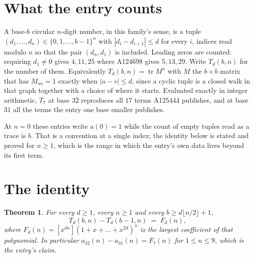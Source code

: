 \documentclass[11pt,a4paper]{article}
\theoremstyle{plain}
\newtheorem{theorem}{Theorem}
\theoremstyle{definition}
\begin{document}
\section{What the entry counts}

A base-$b$ circular $n$-digit number, in this family's sense, is a tuple
$(d_1,\dots,d_n)\in\{0,1,\dots,b-1\}^{n}$ with $|d_i-d_{i+1}|\le d$ for every $i$, indices
read modulo $n$ so that the pair $(d_n,d_1)$ is included. Leading zeros are counted: requiring
$d_1\ne0$ gives $4,11,25$ where A124698 gives $5,13,29$. Write $T_d(b,n)$ for the number of
them. Equivalently $T_d(b,n)=\operatorname{tr}M^{n}$ with $M$ the $b\times b$ matrix that has
$M_{uv}=1$ exactly when $|u-v|\le d$, since a cyclic tuple is a closed walk in that graph
together with a choice of where it starts. Evaluated exactly in integer arithmetic, $T_{7}$
at base $32$ reproduces all $17$ terms A125444 publishes, and at base $31$ all the
terms the entry one base smaller publishes.

At $n=0$ these entries write $a(0)=1$ while the count of empty tuples read as a trace is $b$.
That is a convention at a single index; the identity below is stated and proved for $n\ge1$,
which is the range in which the entry's own data lives beyond its first term.

\section{The identity}

\begin{theorem}
For every $d\ge1$, every $n\ge1$ and every $b\ge d\lfloor n/2\rfloor+1$,
\[
T_d(b,n)-T_d(b-1,n)\;=\;F_d(n),
\]
where $F_d(n)=[x^{dn}](1+x+\dots+x^{2d})^{n}$ is the largest coefficient of that
polynomial. In particular $a_{32}(n)-a_{31}(n)=F_{7}(n)$ for $1\le n\le9$, which
is the entry's claim.
\end{theorem}
\end{document}
